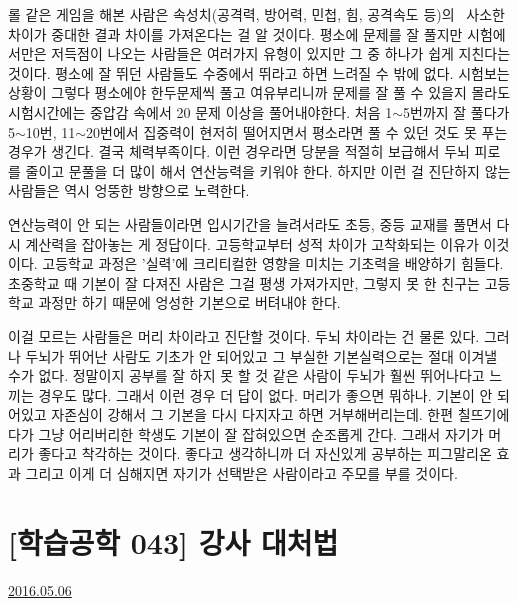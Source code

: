 롤 같은 게임을 해본 사람은 속성치(공격력, 방어력, 민첩, 힘, 공격속도 등)의  사소한 차이가 중대한 결과 차이를 가져온다는 걸 알 것이다.
평소에 문제를 잘 풀지만 시험에서만은 저득점이 나오는 사람들은 여러가지 유형이 있지만
그 중 하나가 쉽게 지친다는 것이다.
평소에 잘 뛰던 사람들도 수중에서 뛰라고 하면 느려질 수 밖에 없다. 시험보는 상황이 그렇다
평소에야 한두문제씩 풀고 여유부리니까 문제를 잘 풀 수 있을지 몰라도 시험시간에는 중압감 속에서 20 문제 이상을 풀어내야한다.
처음 1$\sim$5번까지 잘 풀다가 5$\sim$10번, 11$\sim$20번에서 집중력이 현저히 떨어지면서 평소라면 풀 수 있던 것도 못 푸는 경우가 생긴다.
결국 체력부족이다. 이런 경우라면 당분을 적절히 보급해서 두뇌 피로를 줄이고 문풀을 더 많이 해서 연산능력을 키워야 한다.
하지만 이런 걸 진단하지 않는 사람들은 역시 엉뚱한 방향으로 노력한다.
\vspace{5mm}

연산능력이 안 되는 사람들이라면 입시기간을 늘려서라도 초등, 중등 교재를 풀면서 다시 계산력을 잡아놓는 게 정답이다.
고등학교부터 성적 차이가 고착화되는 이유가 이것이다. 고등학교 과정은 '실력'에 크리티컬한 영향을 미치는 기초력을 배양하기 힘들다.
초중학교 때 기본이 잘 다져진 사람은 그걸 평생 가져가지만, 그렇지 못 한 친구는 고등학교 과정만 하기 때문에 엉성한 기본으로 버텨내야 한다.
\vspace{5mm}

이걸 모르는 사람들은 머리 차이라고 진단할 것이다.
두뇌 차이라는 건 물론 있다. 그러나 두뇌가 뛰어난 사람도 기초가 안 되어있고 그 부실한 기본실력으로는 절대 이겨낼 수가 없다.
정말이지 공부를 잘 하지 못 할 것 같은 사람이 두뇌가 훨씬 뛰어나다고 느끼는 경우도 많다. 그래서 이런 경우 더 답이 없다.
머리가 좋으면 뭐하나. 기본이 안 되어있고 자존심이 강해서 그 기본을 다시 다지자고 하면 거부해버리는데.
한편 칠뜨기에다가 그냥 어리버리한 학생도 기본이 잘 잡혀있으면 순조롭게 간다. 그래서 자기가 머리가 좋다고 착각하는 것이다.
좋다고 생각하니까 더 자신있게 공부하는 피그말리온 효과
그리고 이게 더 심해지면 자기가 선택받은 사람이라고 주모를 부를 것이다.
\vspace{5mm}











\section{[학습공학 043] 강사 대처법}
\href{https://www.kockoc.com/Apoc/763312}{2016.05.06}

\vspace{5mm}

